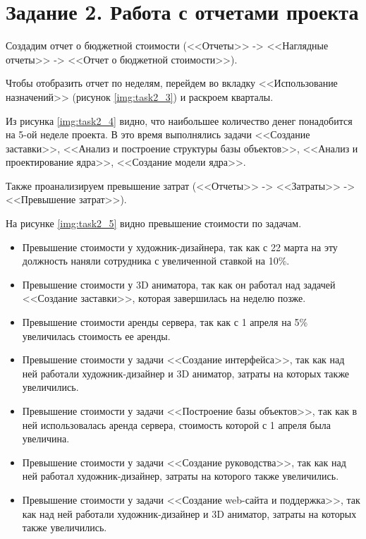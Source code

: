 \documentclass{bmstu}
\begin{document}
\section*{Задание 2. Работа с отчетами проекта}

Создадим отчет о бюджетной стоимости (<<Отчеты>> -> <<Наглядные отчеты>> -> <<Отчет о бюджетной стоимости>>).


\clearpage


Чтобы отобразить отчет по неделям, перейдем во вкладку <<Использование назначений>> (рисунок \ref{img:task2_3}) и раскроем кварталы.


\clearpage


Из рисунка \ref{img:task2_4} видно, что наибольшее количество денег понадобится на 5-ой неделе проекта. В это время выполнялись задачи <<Создание заставки>>, <<Анализ и построение структуры базы объектов>>, <<Анализ и проектирование ядра>>, <<Создание модели ядра>>.

Также проанализируем превышение затрат (<<Отчеты>> -> <<Затраты>> -> <<Превышение затрат>>).


На рисунке \ref{img:task2_5} видно превышение стоимости по задачам.

\begin{itemize}
    \item Превышение стоимости у художник-дизайнера, так как с 22 марта на эту должность наняли сотрудника с увеличенной ставкой на 10\%.
    \item Превышение стоимости у 3D аниматора, так как он работал над задачей <<Создание заставки>>, которая завершилась на неделю позже.
    \item Превышение стоимости аренды сервера, так как с 1 апреля на 5\% увеличилась стоимость ее аренды.
    \item Превышение стоимости у задачи <<Создание интерфейса>>, так как над ней работали художник-дизайнер и 3D аниматор, затраты на которых также увеличились.
    \item Превышение стоимости у задачи <<Построение базы объектов>>, так как в ней использовалась аренда сервера, стоимость которой с 1 апреля была увеличина.
    \item Превышение стоимости у задачи <<Создание руководства>>, так как над ней работал художник-дизайнер, затраты на которого также увеличились.
    \item Превышение стоимости у задачи <<Создание web-сайта и поддержка>>, так как над ней работали художник-дизайнер и 3D аниматор, затраты на которых также увеличились.
\end{itemize}
\end{document}
